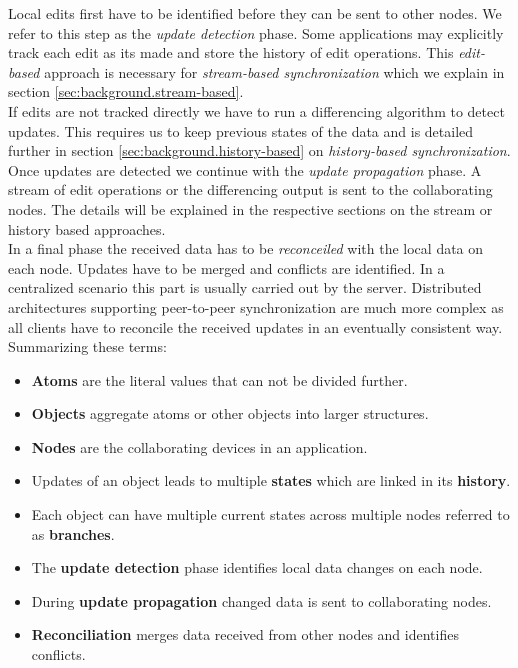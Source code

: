 Local edits first have to be identified before they can be sent to other nodes.
We refer to this step as the \emph{update detection} phase.
Some applications may explicitly track each edit as its made and store the history of edit operations.
This \emph{edit-based} approach is necessary for \emph{stream-based synchronization} which we explain in section \ref{sec:background.stream-based}.\\
If edits are not tracked directly we have to run a differencing algorithm to detect updates.
This requires us to keep previous states of the data and is detailed further in section \ref{sec:background.history-based} on \emph{history-based synchronization}.\\
Once updates are detected we continue with the \emph{update propagation} phase.
A stream of edit operations or the differencing output is sent to the collaborating nodes.
The details will be explained in the respective sections on the stream or history based approaches.\\
In a final phase the received data has to be \emph{reconceiled} with the local data on each node.
Updates have to be merged and conflicts are identified.
In a centralized scenario this part is usually carried out by the server.
Distributed architectures supporting peer-to-peer synchronization are much more complex as all clients have to reconcile the received updates in an eventually consistent way.\\

Summarizing these terms:

\begin{itemize}
\item \textbf{Atoms} are the literal values that can not be divided further.
\item \textbf{Objects} aggregate atoms or other objects into larger structures.
\item \textbf{Nodes} are the collaborating devices in an application.
\item Updates of an object leads to multiple \textbf{states} which are linked in its \textbf{history}.
\item Each object can have multiple current states across multiple nodes referred to as \textbf{branches}.
\item The \textbf{update detection} phase identifies local data changes on each node.
\item During \textbf{update propagation} changed data is sent to collaborating nodes.
\item \textbf{Reconciliation} merges data received from other nodes and identifies conflicts.
\end{itemize}

